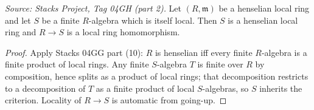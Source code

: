 \begin{lemma}
  \label{lem:henselian-finite-local-is-henselian}
  \textit{Source: Stacks Project, Tag 04GH (part 2).}
  Let $(R, \mathfrak{m})$ be a henselian local ring and let $S$ be a
  finite $R$-algebra which is itself local. Then $S$ is a henselian
  local ring and $R \to S$ is a local ring homomorphism.
\end{lemma}

\begin{proof}
  \leanok
  Apply Stacks 04GG part (10): $R$ is henselian iff every finite
  $R$-algebra is a finite product of local rings. Any finite
  $S$-algebra $T$ is finite over $R$ by composition, hence splits as
  a product of local rings; that decomposition restricts to a
  decomposition of $T$ as a finite product of local $S$-algebras, so
  $S$ inherits the criterion. Locality of $R \to S$ is automatic from
  going-up.
\end{proof}

